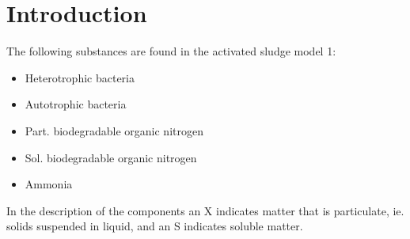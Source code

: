 \section*{Introduction}\label{sec:Introduction}
%
%
%
%
%
%
%
%
%
The following substances are found in the activated sludge model 1:
\begin{itemize}
    \item Heterotrophic bacteria
    \item Autotrophic bacteria
    \item Part. biodegradable organic nitrogen
    \item Sol. biodegradable organic nitrogen
    \item Ammonia 
\end{itemize}

In the description of the components an X indicates matter that is particulate, ie. solids suspended in liquid, and an S indicates soluble matter.

